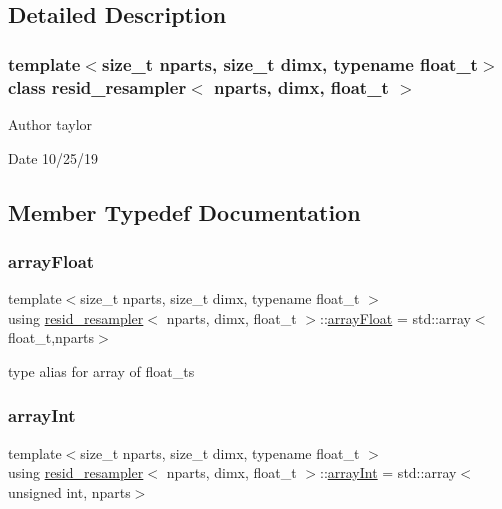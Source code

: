 \subsection{Detailed Description}
\subsubsection*{template$<$size\+\_\+t nparts, size\+\_\+t dimx, typename float\+\_\+t$>$\newline
class resid\+\_\+resampler$<$ nparts, dimx, float\+\_\+t $>$}

\begin{DoxyAuthor}{Author}
taylor 
\end{DoxyAuthor}
\begin{DoxyDate}{Date}
10/25/19 
\end{DoxyDate}


\subsection{Member Typedef Documentation}
\mbox{\label{classresid__resampler_ab95ecc6d5a33f1cbc9089a6b818df405}} 
\subsubsection{\texorpdfstring{array\+Float}{arrayFloat}}
{\footnotesize\ttfamily template$<$size\+\_\+t nparts, size\+\_\+t dimx, typename float\+\_\+t $>$ \\
using \hyperlink{classresid__resampler}{resid\+\_\+resampler}$<$ nparts, dimx, float\+\_\+t $>$\+::\hyperlink{classrbase_a6f76bef853e508cb5b6f546d231b06f5}{array\+Float} =  std\+::array$<$float\+\_\+t,nparts$>$}

type alias for array of float\+\_\+ts \mbox{\label{classresid__resampler_a2ca1138b2d0fcad22c3720c83e56fc47}} 
\subsubsection{\texorpdfstring{array\+Int}{arrayInt}}
{\footnotesize\ttfamily template$<$size\+\_\+t nparts, size\+\_\+t dimx, typename float\+\_\+t $>$ \\
using \hyperlink{classresid__resampler}{resid\+\_\+resampler}$<$ nparts, dimx, float\+\_\+t $>$\+::\hyperlink{classresid__resampler_a2ca1138b2d0fcad22c3720c83e56fc47}{array\+Int} =  std\+::array$<$unsigned int, nparts$>$}

